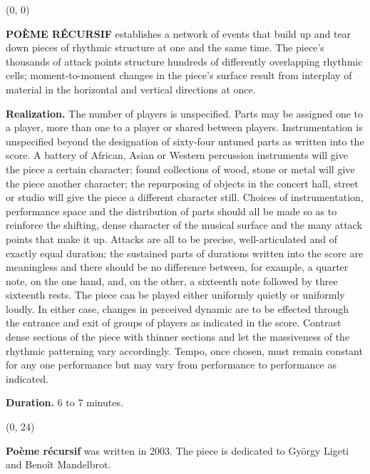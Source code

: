 \documentclass{article}
\begin{document}
\begin{textblock}{12}(0, 0)

\textbf{POÈME RÉCURSIF} establishes a network of events that build up and tear
down pieces of rhythmic structure at one and the same time. The piece's
thousands of attack points structure hundreds of differently overlapping
rhythmic cells; moment-to-moment changes in the piece's surface result from
interplay of material in the horizontal and vertical directions at once.

\textbf{Realization.} The number of players is unspecified. Parts may be
assigned one to a player, more than one to a player or shared between players.
Instrumentation is unspecified beyond the designation of sixty-four untuned
parts as written into the score. A battery of African, Asian or Western
percussion instruments will give the piece a certain character; found
collections of wood, stone or metal will give the piece another character; the
repurposing of objects in the concert hall, street or studio will give the
piece a different character still. Choices of instrumentation, performance
space and the distribution of parts should all be made so as to reinforce the
shifting, dense character of the musical surface and the many attack points
that make it up. Attacks are all to be precise, well-articulated and of exactly
equal duration; the sustained parts of durations written into the score are
meaningless and there should be no difference between, for example, a quarter
note, on the one hand, and, on the other, a sixteenth note followed by three
sixteenth rests. The piece can be played either uniformly quietly or uniformly
loudly. In either case, changes in perceived dynamic are to be effected through
the entrance and exit of groups of players as indicated in the score. Contrast
dense sections of the piece with thinner sections and let the massiveness of
the rhythmic patterning vary accordingly. Tempo, once chosen, must remain
constant for any one performance but may vary from performance to performance
as indicated.

\textbf{Duration.} 6 to 7 minutes.

\end{textblock}


\begin{textblock}{12}(0, 24)

\textbf{Po\`{e}me r\'{e}cursif} was written in 2003. The piece is dedicated to
Gy\"{o}rgy Ligeti and Beno\^{i}t Mandelbrot.

\end{textblock}
\end{document}
